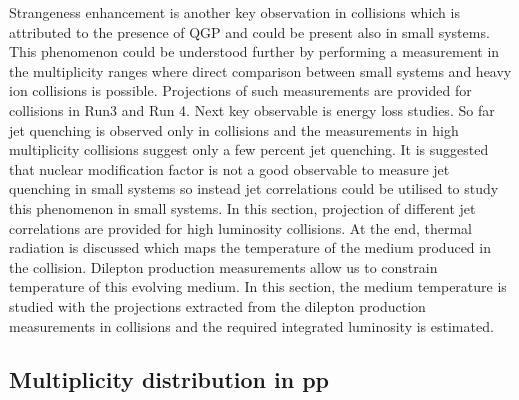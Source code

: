 \documentclass[../report.tex]{subfiles}
\begin{document}
\noindent Strangeness enhancement is another key observation in \PbPb collisions which is attributed to the presence of QGP and could be present also in small systems. This phenomenon could be understood further by performing a measurement in the multiplicity ranges where direct comparison between small systems and heavy ion collisions is possible. Projections of such measurements are provided for \pp collisions in Run3 and Run 4. Next key observable is energy loss studies. So far jet quenching is observed only in \PbPb collisions and the measurements in high multiplicity \pPb collisions suggest only a few percent jet quenching. It is suggested that nuclear modification factor is not a good observable to measure jet quenching in small systems so instead jet correlations could be utilised to study this phenomenon in small systems. In this section, projection of different jet correlations are provided for high luminosity \pp collisions. At the end, thermal radiation is discussed which maps the temperature of the medium produced in the collision. Dilepton production measurements allow us to constrain temperature of this evolving medium. In this section, the medium temperature is studied with the projections extracted from the dilepton production measurements in \pPb collisions and the required integrated luminosity is estimated.






\subsection{Multiplicity distribution in pp}
\label{sect:smallsystems_multiplicity}
\end{document}
